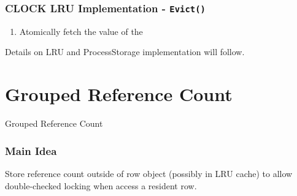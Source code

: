 \documentclass{beamer}
\begin{document}
\begin{frame}
\frametitle{CLOCK LRU Implementation - \texttt{Evict()}}

\begin{enumerate}
\item Atomically fetch the value of the 
\end{enumerate}
Details on LRU and ProcessStorage implementation will follow.
\end{frame}

\section{Grouped Reference Count}

\begin{frame}
Grouped Reference Count
\end{frame}


\begin{frame}
\frametitle{Main Idea}

Store reference count outside of row object (possibly in LRU cache) to allow 
double-checked locking when access a resident row.

\end{frame}
\end{document}
